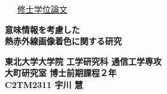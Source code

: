 \begin{titlepage}
\vspace*{.5cm}
\begin{flushleft}
\Large
\ \ \ \underline{修士学位論文}
\end{flushleft}

\vspace*{2cm}
\begin{center}
\begin{minipage}{39zw}
\begin{center}

\huge {\bf 意味情報を考慮した\\熱赤外線画像着色に関する研究}



\end{center}

\end{minipage}
\end{center}

\vspace*{7.5cm}

\begin{flushright}
\begin{center}
\Large {\bf 東北大学大学院 工学研究科 通信工学専攻\\
大町研究室 博士前期課程２年\\
C2TM2311 宇川 慧}
\end{center}
\end{flushright}





\end{titlepage}